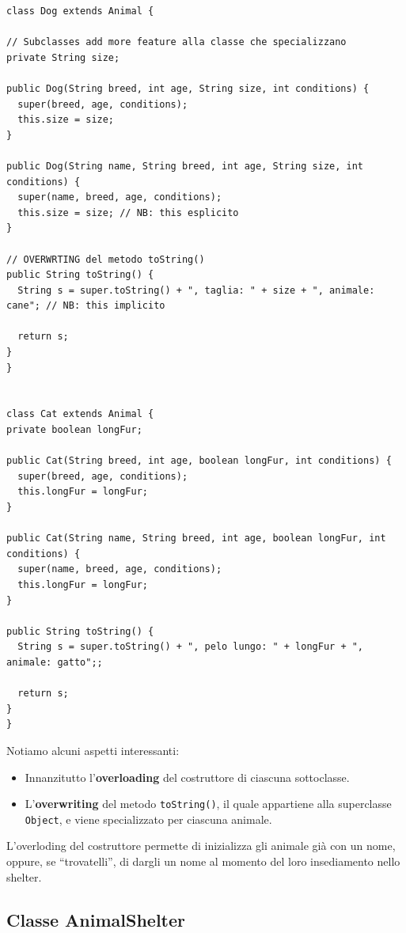 \documentclass[a4paper,11pt]{article}
\begin{document}
\begin{lstlisting}[caption={Aniaml.java -- Estensione della classe {\tt Animal} per definire nuove specie.}]
class Dog extends Animal {

// Subclasses add more feature alla classe che specializzano
private String size;

public Dog(String breed, int age, String size, int conditions) {
  super(breed, age, conditions);
  this.size = size;
}

public Dog(String name, String breed, int age, String size, int conditions) {
  super(name, breed, age, conditions);
  this.size = size; // NB: this esplicito
}

// OVERWRTING del metodo toString()
public String toString() {
  String s = super.toString() + ", taglia: " + size + ", animale: cane"; // NB: this implicito

  return s;
}
}


class Cat extends Animal {
private boolean longFur;

public Cat(String breed, int age, boolean longFur, int conditions) {
  super(breed, age, conditions);
  this.longFur = longFur;
}

public Cat(String name, String breed, int age, boolean longFur, int conditions) {
  super(name, breed, age, conditions);
  this.longFur = longFur;
}

public String toString() {
  String s = super.toString() + ", pelo lungo: " + longFur + ", animale: gatto";;

  return s;
}
}

\end{lstlisting}

Notiamo alcuni aspetti interessanti:
\begin{itemize}
    \item Innanzitutto l'\textbf{overloading} del costruttore di ciascuna sottoclasse.
    \item L'\textbf{overwriting} del metodo {\tt toString()}, il quale appartiene alla superclasse {\tt Object}, e viene specializzato per ciascuna animale.
\end{itemize}

L'overloding del costruttore permette di inizializza gli animale già con un nome, oppure, se ``trovatelli'', di dargli un nome al momento del loro insediamento nello shelter.


\subsection{Classe AnimalShelter}
\end{document}
